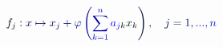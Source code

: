 \documentclass[12pt]{article}
\begin{document}
\makeatletter
\renewcommand*{\@textcolor}[3]{%
  \protect\leavevmode
  \begingroup
    \color#1{#2}#3%
  \endgroup
}
\makeatother
\begin{displaymath}
\mathcolor[RGB]{0,0,15}{f} _ { \mathcolor[RGB]{0,0,30}{j} } \mathcolor[RGB]{0,0,45}{:} \mathcolor[RGB]{0,0,60}{x} \mathcolor[RGB]{0,0,75}{\mapsto} \mathcolor[RGB]{0,0,90}{x} _ { \mathcolor[RGB]{0,0,105}{j} } \mathcolor[RGB]{0,0,120}{+} \mathcolor[RGB]{0,0,135}{\varphi} \mathcolor[RGB]{0,0,150}{\left(} \mathcolor[RGB]{0,0,165}{\sum} _ { \mathcolor[RGB]{0,0,180}{k} \mathcolor[RGB]{0,0,195}{=} \mathcolor[RGB]{0,0,210}{1} } ^ { \mathcolor[RGB]{0,0,225}{n} } \mathcolor[RGB]{0,0,240}{a} _ { \mathcolor[RGB]{0,0,255}{j} \mathcolor[RGB]{0,15,0}{k} } \mathcolor[RGB]{0,15,15}{x} _ { \mathcolor[RGB]{0,15,30}{k} } \mathcolor[RGB]{0,15,45}{\right)} \mathcolor[RGB]{0,15,60}{,} \quad \mathcolor[RGB]{0,15,75}{j} \mathcolor[RGB]{0,15,90}{=} \mathcolor[RGB]{0,15,105}{1} \mathcolor[RGB]{0,15,120}{,} \mathcolor[RGB]{0,15,135}{.} \mathcolor[RGB]{0,15,150}{.} \mathcolor[RGB]{0,15,165}{.} \mathcolor[RGB]{0,15,180}{,} \mathcolor[RGB]{0,15,195}{n}
\end{displaymath}
\end{document}
